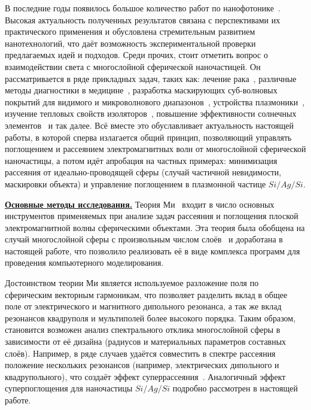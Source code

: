 {\actuality} 

В последние годы появилось большое количество работ по
нанофотонике~\cite{Tame-quantum-plasmonics-2013,
  Javier-graphene-plasmonics-2014, Khurgin-loss-plasmonics-2015,
  He-tunable-terahertz-graphene-metamaterials-2015,
  Segal-meta-nonlinar-PhC-2015,
  Poddubny-hyperbolic-metamaterials-2013, Kildishev-metasurface-2013}.
Высокая актуальность полученных результатов связана с перспективами их
практического применения и обусловлена стремительным развитием
нанотехнологий, что даёт возможность экспериментальной проверки
предлагаемых идей и подходов. Среди прочих, стоит отметить вопрос о
взаимодействии света с многослойной сферической наночастицей. Он
рассматривается в ряде прикладных задач, таких как: лечение
рака~\cite{Zhang-2010, Hirsch-2003}, различные методы диагностики в
медицине~\cite{Allain-2002}, разработка маскирующих суб-волновых
покрытий для видимого и микроволнового диапазонов~\cite{Qui-2009,
  Semouchkina-2013}, устройства плазмоники~\cite{Martin-2013,
  Alu-2005}, изучение тепловых свойств изоляторов~\cite{Xie-2013},
повышение эффективности солнечных элементов~\cite{Kameya-2011,
  Mann-2011} и так далее. Всё вместе это обуславливает актуальность
настоящей работы, в которой сперва излагается общий принцип,
позволяющий управлять поглощением и рассеянием электромагнитных волн от
многослойной сферической наночастицы, а потом идёт апробация на
частных примерах: минимизация рассеяния от идеально-проводящей сферы
(случай частичной невидимости, маскировки объекта) и управление
поглощением в плазмонной частице $Si/Ag/Si$.

\underline{\textbf{Основные методы исследования.}}  Теория
Ми~\cite{Mie-1908} входит в число основных инструментов применяемых
при анализе задач рассеяния и поглощения плоской электромагнитной
волны сферическими объектами. Эта теория была обобщена на случай
многослойной сферы с произвольным числом слоёв~\cite{Yang-2003,
  Pena-scattnlay-2009} и доработана в настоящей работе, что позволило
реализовать её в виде комплекса программ для проведения компьютерного
моделирования.

 Достоинством теории Ми является используемое разложение
поля по сферическим векторным гармоникам, что позволяет разделить
вклад в общее поле от электрического и магнитного дипольного
резонанса, а так же вклад резонансов квадруполя и мультиполей более
высокого порядка. Таким образом, становится возможен анализ
спектрального отклика многослойной сферы в зависимости от её дизайна
(радиусов и материальных параметров составных слоёв). Например, в ряде
случаев удаётся совместить в спектре рассеяния положение нескольких
резонансов (например, электрических дипольного и квадрупольного), что
создаёт эффект суперрассеяния~\cite{Fan-2010,Fan-2011}. Аналогичный
эффект суперпоглощения для наночастицы $Si/Ag/Si$ подробно рассмотрен
в настоящей работе.


